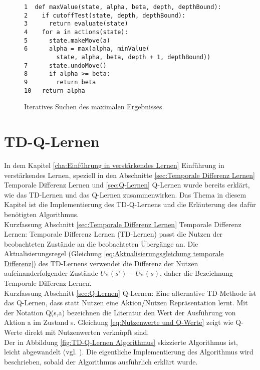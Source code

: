 \begin{figure}[!htbp]
\centering
\begin{lstlisting}[frame=single, mathescape=true]
1  def maxValue(state, alpha, beta, depth, depthBound):
2    if cutoffTest(state, depth, depthBound):
3      return evaluate(state)
4    for a in actions(state):
5      state.makeMove(a)
6      alpha = max(alpha, minValue(
         state, alpha, beta, depth + 1, depthBound))
7      state.undoMove()
8      if alpha >= beta:
9        return beta
10   return alpha
\end{lstlisting}
\caption{Iteratives Suchen des maximalen Ergebnisses.}
\label{fig:Iteratives Suchen des maximalen Ergebnisses}
\end{figure} 

\section{TD-Q-Lernen}
In dem Kapitel \ref{cha:Einführung in verstärkendes Lernen} Einführung in verstärkendes Lernen, speziell in den Abschnitte \ref{sec:Temporale Differenz Lernen} Temporale Differenz Lernen und \ref{sec:Q-Lernen} Q-Lernen wurde bereits erklärt, wie das TD-Lernen und das Q-Lernen zusammenwirken. Das Thema in diesem Kapitel ist die Implementierung des TD-Q-Lernens und die Erläuterung des dafür benötigten Algorithmus. \\

Kurzfassung Abschnitt \ref{sec:Temporale Differenz Lernen} Temporale Differenz Lernen: Temporale Differenz Lernen (TD-Lernen) passt die Nutzen der beobachteten Zustände an die beobachteten Übergänge an. Die Aktualisierungsregel (Gleichung \ref{eq:Aktualisierungsgleichung temporale Differenz}) des TD-Lernens verwendet die Differenz der Nutzen aufeinanderfolgender Zustände $U\pi(s') - U\pi(s)$, daher die Bezeichnung Temporale Differenz Lernen. \\

Kurzfassung Abschnitt \ref{sec:Q-Lernen} Q-Lernen: Eine alternative TD-Methode ist das Q-Lernen, dass statt Nutzen eine Aktion/Nutzen Repräsentation lernt. Mit der Notation Q(s,a) bezeichnen die Literatur den Wert der Ausführung von Aktion a im Zustand s. Gleichung \ref{eq:Nutzenwerte und Q-Werte} zeigt wie Q-Werte direkt mit Nutzenwerten verknüpft sind. \\

Der in Abbildung \ref{fig:TD-Q-Lernen Algorithmus} skizzierte Algorithmus ist, leicht abgewandelt (vgl. \cite[974]{Russell}). Die eigentliche Implementierung des Algorithmus wird beschrieben, sobald der Algorithmus ausführlich erklärt wurde. \\

